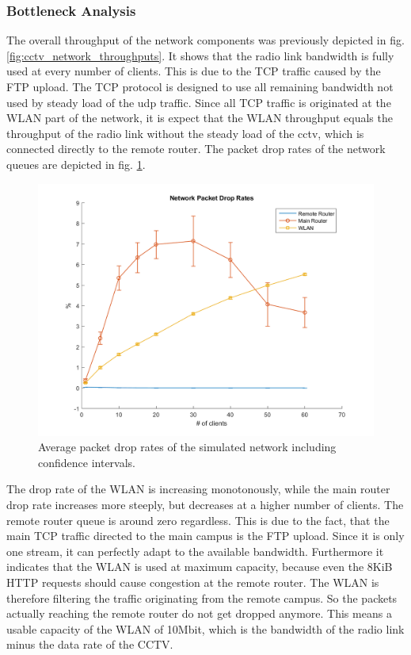 \documentclass[
10pt, %
a4paper, %
oneside, %
headinclude,footinclude, %
BCOR5mm, %
]{scrartcl}
\begin{document}
\subsubsection{Bottleneck Analysis}
The overall throughput of the network components was previously depicted in fig. \ref{fig:cctv_network_throughputs}. It shows that the radio link bandwidth is fully used at every number of clients. This is due to the TCP traffic caused by the FTP upload. The TCP protocol is designed to use all remaining bandwidth not used by steady load of the udp traffic. Since all TCP traffic is originated at the WLAN part of the network, it is expect that the WLAN throughput equals the throughput of the radio link without the steady load of the cctv, which is connected directly to the remote router.
The packet drop rates of the network queues are depicted in fig. \ref{fig:cctv_netw_packet_drop_rates}.
\begin{figure}[!ht]
  \centering
  \includegraphics[width=\textwidth]{Figures/cctv/Network_Packet_Drop_Rates.png}
  \caption{Average packet drop rates of the simulated network including confidence intervals.} \label{fig:cctv_netw_packet_drop_rates}
\end{figure}

The drop rate of the WLAN is increasing monotonously, while the main router drop rate increases more steeply, but decreases at a higher number of clients. The remote router queue is around zero regardless. This is due to the fact, that the main TCP traffic directed to the main campus is the FTP upload. Since it is only one stream, it can perfectly adapt to the available bandwidth. Furthermore it indicates that the WLAN is used at maximum capacity, because even the 8KiB HTTP requests should cause congestion at the remote router. The WLAN is therefore filtering the traffic originating from the remote campus. So the packets actually reaching the remote router do not get dropped anymore. This means a usable capacity of the WLAN of 10Mbit, which is the bandwidth of the radio link minus the data rate of the CCTV.
\end{document}
